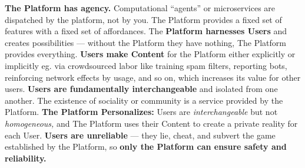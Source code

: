 \textbf{The Platform has agency.} Computational ``agents'' or
microservices are dispatched by the platform, not by you. The Platform
provides a fixed set of features with a fixed set of affordances. The
\textbf{Platform harnesses Users} and creates possibilities --- without the Platform they have
nothing, The Platform provides everything. \textbf{Users make Content}
for the Platform either explicitly or implicitly eg. via crowdsourced
labor like training spam filters, reporting bots, reinforcing network
effects by usage, and so on, which increases its value for other users.
\textbf{Users are fundamentally interchangeable} and isolated from one
another. The existence of sociality or community is a service provided
by the Platform. \textbf{The Platform Personalizes:} Users are
\emph{interchangeable} but not \emph{homogeneous,} and The Platform uses
their Content to create a private reality for each User. \textbf{Users
are unreliable} --- they lie, cheat, and subvert the game established by
the Platform, so \textbf{only the Platform can ensure safety and
reliability.}

